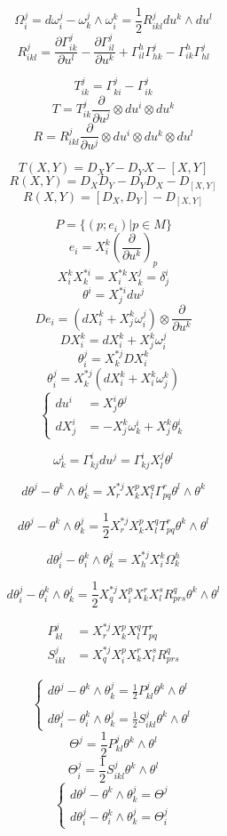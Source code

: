 \documentclass[12pt,a4paper]{article}
\begin{document}
\[
\Omega^j_i = d\omega^j_i - \omega^j_k \wedge \omega^k_i  = \frac{1}{2}R^j_{ikl}du^k \wedge du^l
\]
\[
R^j_{ikl} = \frac{\partial \Gamma^j_{ik}}{\partial u^l}-\frac{\partial \Gamma^j_{il}}{\partial u^k} + \Gamma^h_{il}\Gamma^j_{hk} - \Gamma^h_{ik}\Gamma^j_{hl}
\]

\[
T^j_{ik} = \Gamma^j_{ki} - \Gamma^j_{ik}
\]
\[
T = T^j_{ik} \frac{\partial}{\partial u^j}\otimes du^i \otimes du^k
\]
\[
R = R^j_{ikl} \frac{\partial}{\partial u^j}\otimes du^i \otimes du^k  \otimes du^l
\]

\[
T(X,Y) = D_XY- D_YX - [X,Y] 
\]
\[
R(X,Y) = D_XD_Y - D_YD_X - D_{[X,Y]}
\]
\[
R(X,Y) = [D_X,D_Y] - D_{[X,Y]}
\]

\[
P = \{(p;e_i)|p\in M\}
\]
\[
e_i = X^k_i \left(\frac{\partial}{\partial u^k} \right)_p
\]
\[
X^k_i X^{*i}_k = X^{*k}_iX^j_k = \delta^i_j
\]
\[
\theta^i = X^{*i}_jdu^j
\]
\[
De_i= (dX^k_i + X^k_j \omega^j_i)\otimes\frac{\partial}{\partial u^k}
\]
\[
DX^k_i = dX^k_i + X^k_j \omega^j_i
\]
\[
\theta^j_i = X^{*j}_kDX^k_i
\]
\[
 \theta^j_i= X^{*j}_k(dX^k_i+X^k_i\omega^k_j)
\]
\[
\begin{cases}
du^i &= X^i_j \theta^j \\
dX^i_j & = -X^k_j\omega^i_k + X^k_j \theta^i_k
\end{cases}
\]

\[
\omega^i_k = \Gamma^i_{kj}du^j = \Gamma^i_{kj} X^j_l \theta^l
\]

\[
d\theta^j - \theta^k \wedge \theta^j_k = X^{*j}_rX^p_kX^q_l\Gamma^r_{pq}\theta^l\wedge\theta^k
\]

\[
d\theta^j - \theta^k \wedge \theta^j_k = \frac{1}{2} X^{*j}_rX^p_kX^q_lT^r_{pq}\theta^k\wedge\theta^l
\]

\[
d\theta^j_i - \theta^k_i \wedge \theta^j_k = X^{*j}_hX^k_i\Omega^h_k
\]

\[
d\theta^j_i - \theta^k_i \wedge \theta^j_k = \frac{1}{2} X^{*j}_qX^p_iX^r_kX^s_lR^q_{prs} \theta^k \wedge \theta^l
\]

\begin{align*}
P^j_{kl} &= X^{*j}_rX^p_kX^q_lT^r_{pq}\\
S^j_{ikl} &= X^{*j}_qX^p_iX^r_kX^s_lR^q_{prs}
\end{align*}

\[
\begin{cases}
\displaystyle d\theta^j - \theta^k \wedge \theta^j_k = \frac{1}{2} P^j_{kl} \theta^k \wedge \theta^l \\
\\
\displaystyle d\theta^j_i - \theta^k_i \wedge \theta^j_k = \frac{1}{2} S^j_{ikl} \theta^k \wedge \theta^l
\end{cases}
\]
\[
\Theta^j = \frac{1}{2} P^j_{kl} \theta^k \wedge \theta^l
\]
\[
\Theta^j_i = \frac{1}{2} S^j_{ikl} \theta^k \wedge \theta^l
\]
\[
\begin{cases}
d\theta^j - \theta^k \wedge \theta^j_k =  \Theta^j\\
d\theta^j_i - \theta^k_i \wedge \theta^j_k = \Theta^j_i
\end{cases}
\]
\end{document}
